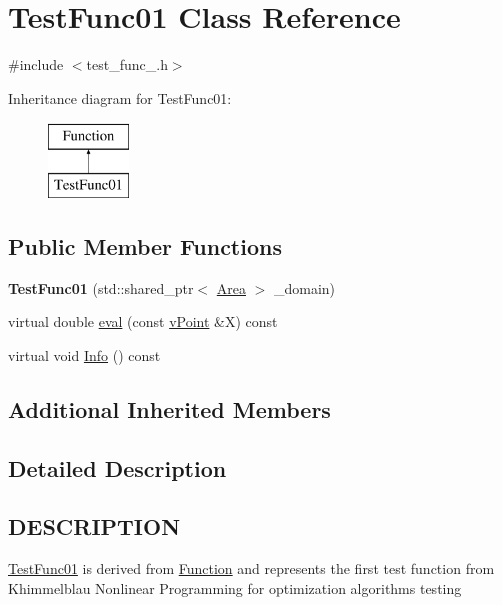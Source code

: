 \hypertarget{class_test_func01}{}\section{Test\+Func01 Class Reference}
\label{class_test_func01}


{\ttfamily \#include $<$test\+\_\+func\+\_.\+h$>$}

Inheritance diagram for Test\+Func01\+:\begin{figure}[H]
\begin{center}
\leavevmode
\includegraphics[height=2.000000cm]{class_test_func01}
\end{center}
\end{figure}
\subsection*{Public Member Functions}
\begin{DoxyCompactItemize}
\item 
\mbox{\label{class_test_func01_aa0544781f37edb1d19675205c305e793}} 
{\bfseries Test\+Func01} (std\+::shared\+\_\+ptr$<$ \hyperlink{class_area}{Area} $>$ \+\_\+domain)
\item 
virtual double \hyperlink{class_test_func01_a50b43b414345a790599ef55960a81cdb}{eval} (const \hyperlink{classv_point}{v\+Point} \&X) const
\item 
virtual void \hyperlink{class_test_func01_a731cfb0260fe58f6eab02f11449737e0}{Info} () const
\end{DoxyCompactItemize}
\subsection*{Additional Inherited Members}


\subsection{Detailed Description}
\hypertarget{function_8h_DESCRIPTION}{}\subsection{D\+E\+S\+C\+R\+I\+P\+T\+I\+ON}\label{function_8h_DESCRIPTION}
\hyperlink{class_test_func01}{Test\+Func01} is derived from \hyperlink{class_function}{Function} and represents the first test function from Khimmelblau \textquotesingle{}Nonlinear Programming\textquotesingle{} for optimization algorithms testing 

